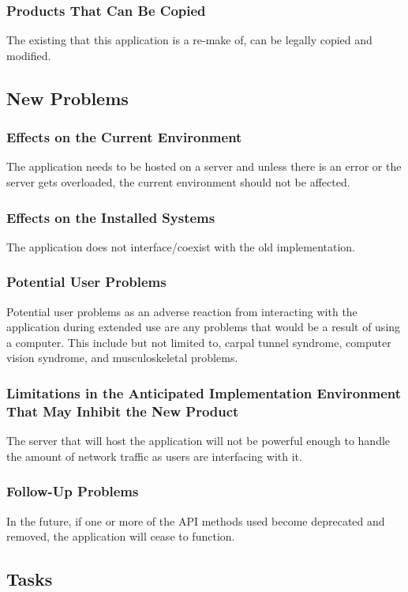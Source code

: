 \documentclass[12pt, titlepage]{article}
\begin{document}
\subsubsection{Products That Can Be Copied}
\noindent The existing that this application is a re-make of, can be legally copied and modified.

\subsection{New Problems}
\subsubsection{Effects on the Current Environment}
The application needs to be hosted on a server and unless there is an error or the server gets overloaded, the current environment should not be affected.

\subsubsection{Effects on the Installed Systems}
The application does not interface/coexist with the old implementation.

\subsubsection{Potential User Problems}
Potential user problems as an adverse reaction from interacting with the application during extended use are any problems that would be a result of using a computer. This include but not limited to, carpal tunnel syndrome, computer vision syndrome, and musculoskeletal problems.

\subsubsection{Limitations in the Anticipated Implementation Environment That May Inhibit the New Product}
The server that will host the application will not be powerful enough to handle the amount of network traffic as users are interfacing with it.

\subsubsection{Follow-Up Problems}
In the future, if one or more of the API methods used become deprecated and removed, the application will cease to function.

\subsection{Tasks}
\end{document}
